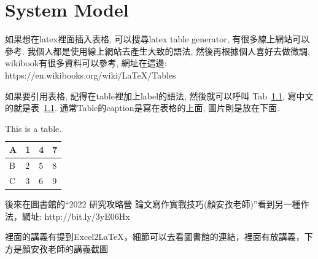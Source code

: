 \chapter{System Model}
\label{ch:architecture}

如果想在latex裡面插入表格, 可以搜尋latex table generator, 有很多線上網站可以參考. 我個人都是使用線上網站去產生大致的語法, 然後再根據個人喜好去做微調, wikibook有很多資料可以參考, 網址在這邊: https://en.wikibooks.org/wiki/LaTeX/Tables

如果要引用表格, 記得在table裡加上label的語法, 然後就可以呼叫 Tab~\ref{tab1}, 寫中文的就是表~\ref{tab1}. 通常Table的caption是寫在表格的上面, 圖片則是放在下面.

\begin{table}[!ht]
    \centering
    \caption{This is a table.}
    \label{tab1}
    \begin{tabular}{|l|l|l|l|}
    \hline
        A & 1 & 4 & 7 \\ \hline
        B & 2 & 5 & 8 \\ \hline
        C & 3 & 6 & 9 \\ \hline
    \end{tabular}
\end{table}

後來在圖書館的``2022 研究攻略營 論文寫作實戰技巧(顏安孜老師)''看到另一種作法，網址: http://bit.ly/3yE06Hx

裡面的講義有提到Excel2LaTeX，細節可以去看圖書館的連結，裡面有放講義，下方是顏安孜老師的講義截圖

